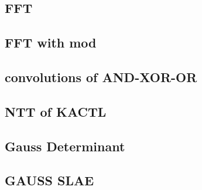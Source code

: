 \subsection{FFT}
\vspace{-2.3ex}
\raggedbottom
\vspace{-3.3ex}
\hrulefill
\vspace{-1ex}
\subsection{FFT with mod}
\vspace{-2.3ex}
\raggedbottom
\vspace{-3.3ex}
\hrulefill
\vspace{-1ex}
\subsection{convolutions of AND-XOR-OR}
\vspace{-2.3ex}
\raggedbottom
\vspace{-3.3ex}
\hrulefill
\vspace{-1ex}
\subsection{NTT of KACTL}
\vspace{-2.3ex}
\raggedbottom
\vspace{-3.3ex}
\hrulefill
\vspace{-1ex}
\subsection{Gauss Determinant}
\vspace{-2.3ex}
\raggedbottom
\vspace{-3.3ex}
\hrulefill
\vspace{-1ex}
\subsection{GAUSS SLAE}
\vspace{-2.3ex}
\raggedbottom
\vspace{-3.3ex}
\hrulefill
\vspace{-1ex}
